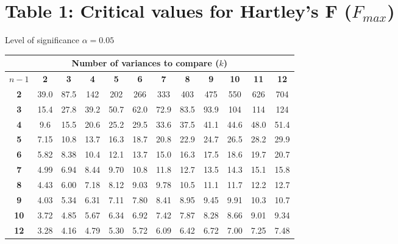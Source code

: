 \section{Table 1: Critical values for Hartley’s F ($F_{max}$)}
\label{table1}

Level of significance $\alpha = 0.05$ \\
\begin{center}
\small
\begin{tabular}{c|c|c|c|c|c|c|c|c|c|c|c}
\hline
\multicolumn{12}{c}{\textbf{Number of variances to compare} ($k$)}                    \bstrut\tstrut\\
\hline
$n - 1$ & \multicolumn{1}{c}{\textbf{2}}    & \multicolumn{1}{c}{\textbf{3}}    & \multicolumn{1}{c}{\textbf{4}}    & \multicolumn{1}{c}{\textbf{5}}    & \multicolumn{1}{c}{\textbf{6}}    & \multicolumn{1}{c}{\textbf{7}}    & \multicolumn{1}{c}{\textbf{8}}    & \multicolumn{1}{c}{\textbf{9}}    & \multicolumn{1}{c}{\textbf{10}}   & \multicolumn{1}{c}{\textbf{11}}   & \multicolumn{1}{c}{\textbf{12}} \bstrut\tstrut\\
\hline
\textbf{2}     & 39.0 & 87.5 & 142  & 202  & 266  & 333  & 403  & 475  & 550  & 626  & 704  \bstrut\tstrut\\
\textbf{3}     & 15.4 & 27.8 & 39.2 & 50.7 & 62.0 & 72.9 & 83.5 & 93.9 & 104  & 114  & 124  \bstrut\tstrut\\
\textbf{4}     & 9.6  & 15.5 & 20.6 & 25.2 & 29.5 & 33.6 & 37.5 & 41.1 & 44.6 & 48.0 & 51.4 \bstrut\tstrut\\
\textbf{5}     & 7.15 & 10.8 & 13.7 & 16.3 & 18.7 & 20.8 & 22.9 & 24.7 & 26.5 & 28.2 & 29.9 \bstrut\tstrut\\
\textbf{6}     & 5.82 & 8.38 & 10.4 & 12.1 & 13.7 & 15.0 & 16.3 & 17.5 & 18.6 & 19.7 & 20.7 \bstrut\tstrut\\
\textbf{7}     & 4.99 & 6.94 & 8.44 & 9.70 & 10.8 & 11.8 & 12.7 & 13.5 & 14.3 & 15.1 & 15.8 \bstrut\tstrut\\
\textbf{8}     & 4.43 & 6.00 & 7.18 & 8.12 & 9.03 & 9.78 & 10.5 & 11.1 & 11.7 & 12.2 & 12.7 \bstrut\tstrut\\
\textbf{9}     & 4.03 & 5.34 & 6.31 & 7.11 & 7.80 & 8.41 & 8.95 & 9.45 & 9.91 & 10.3 & 10.7 \bstrut\tstrut\\
\textbf{10}    & 3.72 & 4.85 & 5.67 & 6.34 & 6.92 & 7.42 & 7.87 & 8.28 & 8.66 & 9.01 & 9.34 \bstrut\tstrut\\
\textbf{12}    & 3.28 & 4.16 & 4.79 & 5.30 & 5.72 & 6.09 & 6.42 & 6.72 & 7.00 & 7.25 & 7.48 \bstrut\tstrut\\

\end{tabular}
\end{center}
